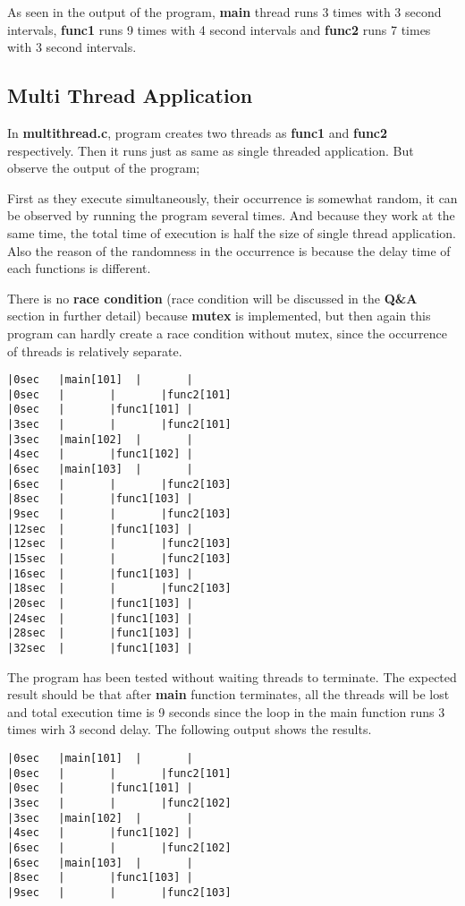 \documentclass[11pt]{article}
\begin{document}
As seen in the output of the program, \textbf{main} thread runs 3 times with 3 second intervals, \textbf{func1} runs 9 times with 4 second intervals and \textbf{func2} runs 7 times with 3 second intervals.

\subsection*{Multi Thread Application}
In \textbf{multithread.c}, program creates two threads as \textbf{func1} and \textbf{func2} respectively. Then it runs just as same as single threaded application. But observe the output of the program;

First as they execute simultaneously, their occurrence is somewhat random, it can be observed by running the program several times. And because they work at the same time, the total time of execution is half the size of single thread application. Also the reason of the randomness in the occurrence is because the delay time of each functions is different.

There is no \textbf{race condition} (race condition will be discussed in the \textbf{Q\&A} section in further detail) because \textbf{mutex} is implemented, but then again this program can hardly create a race condition without mutex, since the occurrence of threads is relatively separate.

\begin{minipage}{1\textwidth}
\begin{lstlisting}[title=Timeline (multithread.c), frame=tlrb]
|0sec	|main[101]	|		|
|0sec	|		|		|func2[101]
|0sec	|		|func1[101]	|
|3sec	|		|		|func2[101]
|3sec	|main[102]	|		|
|4sec	|		|func1[102]	|
|6sec	|main[103]	|		|
|6sec	|		|		|func2[103]
|8sec	|		|func1[103]	|
|9sec	|		|		|func2[103]
|12sec	|		|func1[103]	|
|12sec	|		|		|func2[103]
|15sec	|		|		|func2[103]
|16sec	|		|func1[103]	|
|18sec	|		|		|func2[103]
|20sec	|		|func1[103]	|
|24sec	|		|func1[103]	|
|28sec	|		|func1[103]	|
|32sec	|		|func1[103]	|
\end{lstlisting}
\end{minipage}

The program has been tested without waiting threads to terminate. The expected result should be that after \textbf{main} function terminates, all the threads will be lost and total execution time is 9 seconds since the loop in the main function runs 3 times wirh 3 second delay. The following output shows the results.

\begin{minipage}{1\textwidth}
\begin{lstlisting}[title=Timeline (multithread.c) without wait, frame=tlrb]
|0sec	|main[101]	|		|
|0sec	|		|		|func2[101]
|0sec	|		|func1[101]	|
|3sec	|		|		|func2[102]
|3sec	|main[102]	|		|
|4sec	|		|func1[102]	|
|6sec	|		|		|func2[102]
|6sec	|main[103]	|		|
|8sec	|		|func1[103]	|
|9sec	|		|		|func2[103]
\end{lstlisting}
\end{minipage}
\end{document}
